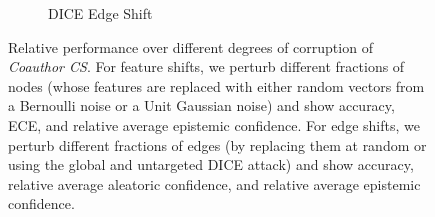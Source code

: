 \begin{figure}
\begin{subfigure}{\textwidth}
        \caption{DICE \citep{Waniek2018} Edge Shift}
    \end{subfigure}
    \caption{Relative performance over different degrees of corruption of \emph{Coauthor CS}. For feature shifts, we perturb different fractions of nodes (whose features are replaced with either random vectors from a Bernoulli noise or a Unit Gaussian noise) and show accuracy, ECE, and relative average epistemic confidence. For edge shifts, we perturb different fractions of edges (by replacing them at random or using the global and untargeted DICE \citep{Waniek2018} attack) and show accuracy, relative average aleatoric confidence, and relative average epistemic confidence.}
    \label{fig:shift-coauthor-cs}
\end{figure}